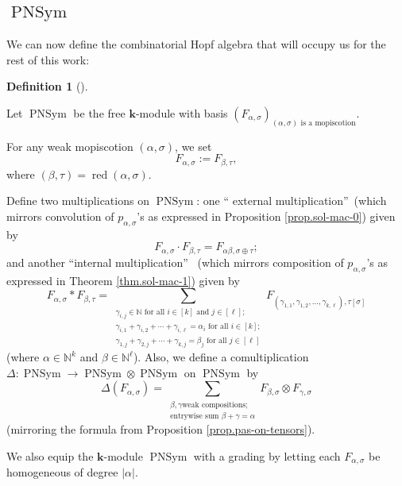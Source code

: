 \documentclass[numbers=enddot,12pt,final,onecolumn,notitlepage]{scrartcl}%
\theoremstyle{definition}
\newtheorem{defi}[theo]{Definition}
\newenvironment{definition}[1][]
{\begin{defi}[#1]\begin{leftbar}}
{\end{leftbar}\end{defi}}
\let\sumnonlimits\sum
\renewcommand{\sum}{\sumnonlimits\limits}
\begin{document}
\subsection{$\operatorname*{PNSym}$}

We can now define the combinatorial Hopf algebra that will occupy us for the
rest of this work:

\begin{definition}
\label{def.PNSym.ops}Let $\operatorname*{PNSym}$ be the free $\mathbf{k}%
$-module with basis $\left(  F_{\alpha,\sigma}\right)  _{\left(  \alpha
,\sigma\right)  \text{ is a mopiscotion}}$.

For any weak mopiscotion $\left(  \alpha,\sigma\right)  $, we set%
\[
F_{\alpha,\sigma}:=F_{\beta,\tau},
\]
where $\left(  \beta,\tau\right)  =\operatorname*{red}\left(  \alpha
,\sigma\right)  $.

Define two multiplications on $\operatorname*{PNSym}$: one \textquotedblleft
external multiplication\textquotedblright\ (which mirrors convolution of
$p_{\alpha,\sigma}$'s as expressed in Proposition \ref{prop.sol-mac-0}) given
by%
\[
F_{\alpha,\sigma}\cdot F_{\beta,\tau}=F_{\alpha\beta,\sigma\oplus\tau};
\]
and another \textquotedblleft internal multiplication\textquotedblright%
\ (which mirrors composition of $p_{\alpha,\sigma}$'s as expressed in Theorem
\ref{thm.sol-mac-1}) given by%
\[
F_{\alpha,\sigma}\ast F_{\beta,\tau}=\sum_{\substack{\gamma_{i,j}\in
\mathbb{N}\text{ for all }i\in\left[  k\right]  \text{ and }j\in\left[
\ell\right]  ;\\\gamma_{i,1}+\gamma_{i,2}+\cdots+\gamma_{i,\ell}=\alpha
_{i}\text{ for all }i\in\left[  k\right]  ;\\\gamma_{1,j}+\gamma_{2,j}%
+\cdots+\gamma_{k,j}=\beta_{j}\text{ for all }j\in\left[  \ell\right]
}}F_{\left(  \gamma_{1,1},\gamma_{1,2},\ldots,\gamma_{k,\ell}\right)
,\tau\left[  \sigma\right]  }%
\]
(where $\alpha\in\mathbb{N}^{k}$ and $\beta\in\mathbb{N}^{\ell}$). Also, we
define a comultiplication $\Delta:\operatorname*{PNSym}\rightarrow
\operatorname*{PNSym}\otimes\operatorname*{PNSym}$ on $\operatorname*{PNSym}$
by%
\[
\Delta\left(  F_{\alpha,\sigma}\right)  =\sum_{\substack{\beta,\gamma\text{
weak compositions;}\\\text{entrywise sum }\beta+\gamma=\alpha}}F_{\beta
,\sigma}\otimes F_{\gamma,\sigma}%
\]
(mirroring the formula from Proposition \ref{prop.pas-on-tensors}).

We also equip the $\mathbf{k}$-module $\operatorname*{PNSym}$ with a grading
by letting each $F_{\alpha,\sigma}$ be homogeneous of degree $\left\vert
\alpha\right\vert $.
\end{definition}
\end{document}
